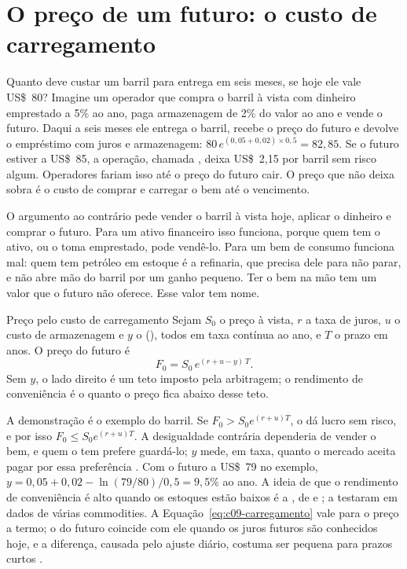 \section{O preço de um futuro: o custo de carregamento}
\label{sec:c09-preco}

Quanto deve custar um barril para entrega em seis meses, se hoje ele vale US\$~80? Imagine um operador que compra o barril à vista com dinheiro emprestado a 5\% ao ano, paga armazenagem de 2\% do valor ao ano e vende o futuro. Daqui a seis meses ele entrega o barril, recebe o preço do futuro e devolve o empréstimo com juros e armazenagem: $80\,e^{(0,05+0,02)\times 0,5} = 82,85$. Se o futuro estiver a US\$~85, a operação, chamada , deixa US\$~2,15 por barril sem risco algum. Operadores fariam isso até o preço do futuro cair. O preço que não deixa sobra é o custo de comprar e carregar o bem até o vencimento.

O argumento ao contrário pede vender o barril à vista hoje, aplicar o dinheiro e comprar o futuro. Para um ativo financeiro isso funciona, porque quem tem o ativo, ou o toma emprestado, pode vendê-lo. Para um bem de consumo funciona mal: quem tem petróleo em estoque é a refinaria, que precisa dele para não parar, e não abre mão do barril por um ganho pequeno. Ter o bem na mão tem um valor que o futuro não oferece. Esse valor tem nome.

\begin{resultado}{Preço pelo custo de carregamento}
Sejam $S_0$ o preço à vista, $r$ a taxa de juros, $u$ o custo de armazenagem e $y$ o  (), todos em taxa contínua ao ano, e $T$ o prazo em anos. O preço do futuro é
\begin{equation}
  F_0 = S_0\, e^{(r + u - y)\,T} .
  \label{eq:c09-carregamento}
\end{equation}
Sem $y$, o lado direito é um teto imposto pela arbitragem; o rendimento de conveniência é o quanto o preço fica abaixo desse teto.
\end{resultado}

A demonstração é o exemplo do barril. Se $F_0 > S_0 e^{(r+u)T}$, o  dá lucro sem risco, e por isso $F_0 \le S_0 e^{(r+u)T}$. A desigualdade contrária dependeria de vender o bem, e quem o tem prefere guardá-lo; $y$ mede, em taxa, quanto o mercado aceita pagar por essa preferência \citep[cap.~5]{hull2022}. Com o futuro a US\$~79 no exemplo, $y = 0,05 + 0,02 - \ln(79/80)/0,5 = 9,5\%$ ao ano. A ideia de que o rendimento de conveniência é alto quando os estoques estão baixos é a , de \citet{kaldor1939} e \citet{working1949}; \citet{fama1987} a testaram em dados de várias commodities. A Equação~\eqref{eq:c09-carregamento} vale para o preço a termo; o do futuro coincide com ele quando os juros futuros são conhecidos hoje, e a diferença, causada pelo ajuste diário, costuma ser pequena para prazos curtos \citep[cap.~5]{hull2022}.

